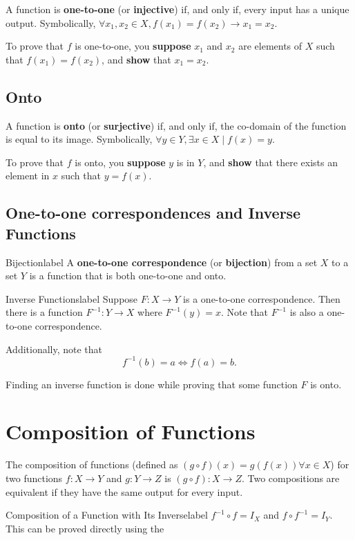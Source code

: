 \documentclass[a4paper]{report}
\begin{document}
A function is \textbf{one-to-one} (or \textbf{injective}) if, and only if, every input has a unique 
output. Symbolically, $\forall x_1, x_2 \in X, f(x_1)=f(x_2) \to x_1 = x_2$.

To prove that $f$ is one-to-one, you \textbf{suppose} $x_1$ and $x_2$ are elements of $X$ such that
$f(x_1)=f(x_2)$, and \textbf{show} that $x_1=x_2$.

\subsection{Onto}

A function is \textbf{onto} (or \textbf{surjective}) if, and only if, the co-domain of the function
is equal to its image. Symbolically, $\forall y \in Y, \exists x \in X  \mid f(x) = y$.

To prove that $f$ is onto, you \textbf{suppose} $y$ is in $Y$, and \textbf{show} that
there exists an element in $x$ such that $y = f(x)$.

\subsection{One-to-one correspondences and Inverse Functions}

\begin{definition}{Bijection}{label}
    A \textbf{one-to-one correspondence} (or \textbf{bijection}) from a set $X$ to a set $Y$ is
    a function that is both one-to-one and onto.
\end{definition}

\begin{theorem}{Inverse Functions}{label}
    Suppose $F: X \to Y$ is a one-to-one correspondence. Then there is a function $F^{-1}: Y \to X$
    where $F^{-1}(y)=x$. Note that $F^{-1}$ is also a one-to-one correspondence.

    Additionally, note that \[
        f^{-1}(b) = a \Leftrightarrow f(a) = b
    .\] 
\end{theorem}

Finding an inverse function is done while proving that some function $F$ is onto.

\section{Composition of Functions}

The composition of functions (defined as $(g \circ f)(x) = g(f(x)) \forall x \in X$) for two
functions $f: X \to Y$ and $g: Y \to Z$ is $(g \circ f): X \to Z$.
Two compositions are equivalent if they have the same output for every input.

\begin{theorem}{Composition of a Function with Its Inverse}{label}
    $f^{-1} \circ f = I_X$ and $f \circ f^{-1} = I_Y$. This can be proved directly using the
\end{theorem}
\end{document}
